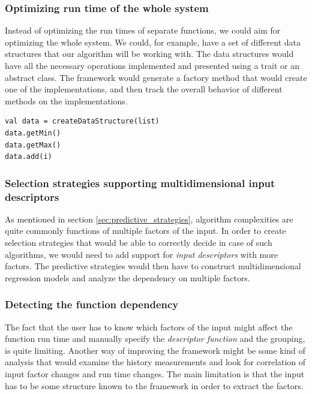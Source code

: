 \subsubsection{Optimizing run time of the whole system}

Instead of optimizing the run times of separate functions, we could aim for optimizing the whole system. We could, for example, have a set of different data structures that our algorithm will be working with. The data structures would have all the necessary operations implemented and presented using a trait or an abstract class. The framework would generate a factory method that would create one of the implementations, and then track the overall behavior of different methods on the implementations. 

\lstset{style=Scala}
\begin{lstlisting}
val data = createDataStructure(list)
data.getMin()
data.getMax()
data.add(i)
\end{lstlisting}

\subsubsection{Selection strategies supporting multidimensional input descriptors}

As mentioned in section \ref{sec:predictive_strategies}, algorithm complexities are quite commonly functions of multiple factors of the input. In order to create selection strategies that would be able to correctly decide in case of such algorithms, we would need to add support for \textit{input descriptors} with more factors. The predictive strategies would then have to construct multidimensional regression models and analyze the dependency on multiple factors.

\subsubsection{Detecting the function dependency}

The fact that the user has to know which factors of the input might affect the function run time and manually specify the \textit{descriptor function} and the grouping, is quite limiting. Another way of improving the framework might be some kind of analysis that would examine the history measurements and look for correlation of input factor changes and run time changes. The main limitation is that the input has to be some structure known to the framework in order to extract the factors.

